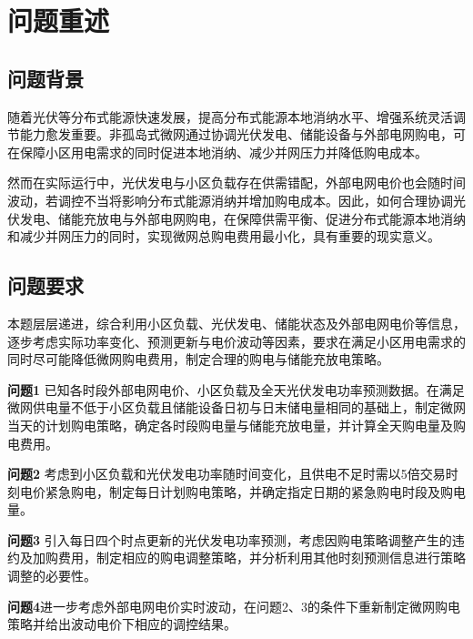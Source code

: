 


\section{问题重述}

\subsection{问题背景}


随着光伏等分布式能源快速发展，提高分布式能源本地消纳水平、增强系统灵活调节能力愈发重要。非孤岛式微网通过协调光伏发电、储能设备与外部电网购电，可在保障小区用电需求的同时促进本地消纳、减少并网压力并降低购电成本。


然而在实际运行中，光伏发电与小区负载存在供需错配，外部电网电价也会随时间波动，若调控不当将影响分布式能源消纳并增加购电成本。因此，如何合理协调光伏发电、储能充放电与外部电网购电，在保障供需平衡、促进分布式能源本地消纳和减少并网压力的同时，实现微网总购电费用最小化，具有重要的现实意义。



\subsection{问题要求}

本题层层递进，综合利用小区负载、光伏发电、储能状态及外部电网电价等信息，逐步考虑实际功率变化、预测更新与电价波动等因素，要求在满足小区用电需求的同时尽可能降低微网购电费用，制定合理的购电与储能充放电策略。

\textbf{问题1}
已知各时段外部电网电价、小区负载及全天光伏发电功率预测数据。在满足微网供电量不低于小区负载且储能设备日初与日末储电量相同的基础上，制定微网当天的计划购电策略，确定各时段购电量与储能充放电量，并计算全天购电量及购电费用。



\textbf{问题2}
考虑到小区负载和光伏发电功率随时间变化，且供电不足时需以5倍交易时刻电价紧急购电，制定每日计划购电策略，并确定指定日期的紧急购电时段及购电量。


\textbf{问题3}
引入每日四个时点更新的光伏发电功率预测，考虑因购电策略调整产生的违约及加购费用，制定相应的购电调整策略，并分析利用其他时刻预测信息进行策略调整的必要性。


\textbf{问题4}进一步考虑外部电网电价实时波动，在问题2、3的条件下重新制定微网购电策略并给出波动电价下相应的调控结果。

